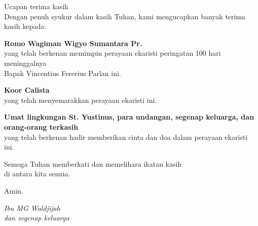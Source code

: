 \documentclass[titlepage,10pt,openany]{scrbook}
\newcommand{\namaalm}{Bapak Vincentius Fererius Parlan }
\newcommand{\namaromo}{Wagiman Wigyo Sumantara Pr.}
\begin{document}
\newpage
\begin{flushright}
{\Large Ucapan terima kasih}\\
\noindent Dengan penuh syukur dalam kasih Tuhan, kami mengucapkan banyak
terima kasih kepada:
\large

\textbf{Romo \namaromo}\\
yang telah berkenan memimpin perayaan ekaristi peringatan 100 hari meninggalnya\\ \namaalm
ini.

\textbf{Koor Calista}\\
yang telah menyemarakkan perayaan ekaristi ini.

\textbf{Umat lingkungan St. Yustinus, para undangan, segenap keluarga, dan orang-orang terkasih}\\
yang telah berkenan hadir memberikan cinta dan doa dalam perayaan
ekaristi ini.

Semoga Tuhan memberkati dan memelihara ikatan kasih\\ di antara kita semua.

Amin.

\bigskip 

\textit{Ibu MG Waldjijah\\
dan segenap keluarga}
\end{flushright}
\end{document}
